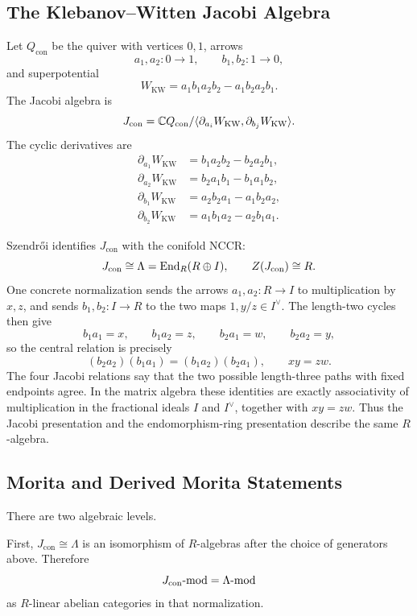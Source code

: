 \subsection*{The Klebanov--Witten Jacobi Algebra}

Let \(Q_{\mathrm{con}}\) be the quiver with vertices \(0,1\), arrows
\[
  a_1,a_2\colon 0\to 1,\qquad b_1,b_2\colon 1\to 0,
\]
and superpotential
\[
  W_{\mathrm{KW}}=
  a_1b_1a_2b_2-a_1b_2a_2b_1 .
\]
The Jacobi algebra is
\[
  J_{\mathrm{con}}=
  \mathbb C Q_{\mathrm{con}}/
  \langle\partial_{a_i}W_{\mathrm{KW}},
         \partial_{b_j}W_{\mathrm{KW}}\rangle .
\]
The cyclic derivatives are
\[
\begin{aligned}
  \partial_{a_1}W_{\mathrm{KW}}&=b_1a_2b_2-b_2a_2b_1,\\
  \partial_{a_2}W_{\mathrm{KW}}&=b_2a_1b_1-b_1a_1b_2,\\
  \partial_{b_1}W_{\mathrm{KW}}&=a_2b_2a_1-a_1b_2a_2,\\
  \partial_{b_2}W_{\mathrm{KW}}&=a_1b_1a_2-a_2b_1a_1 .
\end{aligned}
\]

Szendr\H{o}i identifies \(J_{\mathrm{con}}\) with the conifold NCCR:
\[
  J_{\mathrm{con}}\cong\Lambda=\mathrm{End}_R(R\oplus I),
  \qquad
  Z(J_{\mathrm{con}})\cong R .
\]
One concrete normalization sends the arrows \(a_1,a_2\colon R\to I\) to
multiplication by \(x,z\), and sends \(b_1,b_2\colon I\to R\) to the two
maps \(1,y/z\in I^\vee\).  The length-two cycles then give
\[
  b_1a_1=x,\qquad b_1a_2=z,\qquad b_2a_1=w,\qquad b_2a_2=y,
\]
so the central relation is precisely
\[
  (b_2a_2)(b_1a_1)=(b_1a_2)(b_2a_1),
  \qquad xy=zw .
\]
The four Jacobi relations say that the two possible length-three paths
with fixed endpoints agree.  In the matrix algebra these identities are
exactly associativity of multiplication in the fractional ideals
\(I\) and \(I^\vee\), together with \(xy=zw\).  Thus the
Jacobi presentation and the endomorphism-ring presentation describe the
same \(R\)-algebra.

\subsection*{Morita and Derived Morita Statements}

There are two algebraic levels.

First, \(J_{\mathrm{con}}\cong\Lambda\) is an isomorphism of
\(R\)-algebras after the choice of generators above.  Therefore
\[
  J_{\mathrm{con}}\text{-}\mathrm{mod}=\Lambda\text{-}\mathrm{mod}
\]
as \(R\)-linear abelian categories in that normalization.

